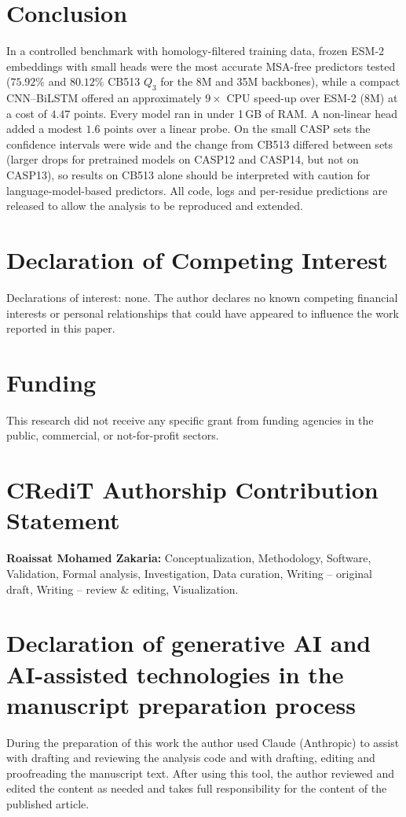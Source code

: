 \documentclass[preprint,12pt,authoryear]{elsarticle}
\begin{document}
\section{Conclusion}
\label{sec:conclusion}
In a controlled benchmark with homology-filtered training data, frozen ESM-2 embeddings with small heads were the most accurate MSA-free predictors tested ($75.92\%$ and $80.12\%$ CB513 $Q_3$ for the 8M and 35M backbones), while a compact CNN--BiLSTM offered an approximately $9\times$ CPU speed-up over ESM-2 (8M) at a cost of $4.47$ points. Every model ran in under 1\,GB of RAM. A non-linear head added a modest $1.6$ points over a linear probe. On the small CASP sets the confidence intervals were wide and the change from CB513 differed between sets (larger drops for pretrained models on CASP12 and CASP14, but not on CASP13), so results on CB513 alone should be interpreted with caution for language-model-based predictors. All code, logs and per-residue predictions are released to allow the analysis to be reproduced and extended.

\section*{Declaration of Competing Interest}
Declarations of interest: none. The author declares no known competing financial interests or personal relationships that could have appeared to influence the work reported in this paper.

\section*{Funding}
This research did not receive any specific grant from funding agencies in the public, commercial, or not-for-profit sectors.

\section*{CRediT Authorship Contribution Statement}
\textbf{Roaissat Mohamed Zakaria:} Conceptualization, Methodology, Software, Validation, Formal analysis, Investigation, Data curation, Writing -- original draft, Writing -- review \& editing, Visualization.

\section*{Declaration of generative AI and AI-assisted technologies in the manuscript preparation process}
During the preparation of this work the author used Claude (Anthropic) to assist with drafting and reviewing the analysis code and with drafting, editing and proofreading the manuscript text. After using this tool, the author reviewed and edited the content as needed and takes full responsibility for the content of the published article.
\end{document}
